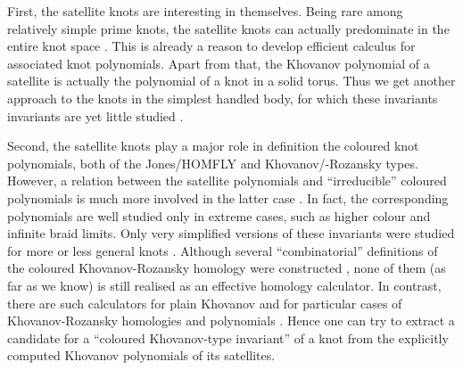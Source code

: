 \documentclass[11pt]{article}
\begin{document}
First, the satellite knots are interesting in themselves. Being rare among relatively simple prime knots, the satellite knots can actually predominate in the entire knot space \cite{MalBelSat,MalSat}. This is already a reason to develop efficient calculus for associated knot polynomials.%
Apart from that, the Khovanov polynomial of a satellite is actually the polynomial of a knot in a solid torus. Thus we get another approach to the knots in the simplest handled body, for which these invariants invariants are yet little studied \cite{KhHand}. 


Second, the satellite knots play a major role in definition the coloured knot polynomials, both of the Jones/HOMFLY \cite{AMcab} and Khovanov/-Rozansky \cite{KhoCol,HedCol} types. %
However, a relation between the satellite polynomials and ``irreducible'' coloured polynomials is much more involved in the latter case \cite{MacTurCol,BelWehCol,CapCol,ItoCol}. In fact, the corresponding polynomials are well studied only in extreme cases, such as higher colour \cite{RozCol} and infinite braid \cite{WilCol} limits. Only very simplified versions of these invariants were studied for more or less general knots \cite{MacTurCol,RosWedCol}.
Although several ``combinatorial'' definitions of the coloured Khovanov-Rozansky homology were constructed \cite{QueRosCol, RobWagcol},  none of them (as far as we know) is still realised as an effective homology calculator. In contrast, there are such calculators for plain Khovanov and for particular cases of Khovanov-Rozansky homologies and polynomials \cite{LukHomCal}. Hence one can try to extract a candidate for a ``coloured Khovanov-type invariant'' of a knot from the explicitly computed Khovanov polynomials of its satellites.
\end{document}
